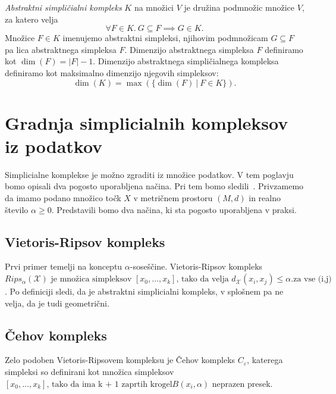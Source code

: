 \begin{definicija}
      \textit{Abstraktni simpli\v{c}ialni kompleks} \(K\) na množici \(V\) je družina podmnožic množice \(V\), za katero velja
  \[
  \forall F \in K. \ G \subseteq F \implies G \in K.
  \]
  Množice \(F \in K\) imenujemo abstraktni simpleksi, njihovim podmnožicam \(G \subseteq F\) pa lica abstraktnega simpleksa \(F\). Dimenzijo abstraktnega simpleksa \(F\) definiramo kot \(\dim(F) = |F| - 1\). Dimenzijo abstraktnega simpli\v{c}ialnega kompleksa definiramo kot maksimalno dimenzijo njegovih simpleksov:
  \[
  \dim(K) = \max(\{\dim(F) \ | \ F \in K\}).
  \]
\end{definicija}


\section{Gradnja simplicialnih kompleksov iz podatkov}
Simplicialne komplekse je možno zgraditi iz množice podatkov. V tem poglavju bomo opisali dva pogosto uporabljena načina. Pri tem bomo sledili~\cite{10.1007/978-3-319-45378-1_1}. Privzamemo da imamo podano množico točk $X$ v metričnem prostoru $(M, d)$ in realno število $\alpha \geq 0$. Predstavili bomo dva načina, ki sta pogosto uporabljena v praksi.~\cite{kun2015cech}

\subsection{Vietoris-Ripsov kompleks}
Prvi primer temelji na konceptu $\alpha$-soseščine. Vietoris-Ripsov kompleks $Rips_{\alpha}(\mathcal{X}) \text{ je množica simpleksov } [x_0, \ldots, x_k] \text{, tako da velja } d_{\mathcal{X}}(x_i, x_j) \leq \alpha. \text{za vse (i,j)}$. Po definiciji sledi, da je abstraktni simplicialni kompleks, v splošnem pa ne velja, da je tudi geometrični.

\subsection{Čehov kompleks}
Zelo podoben Vietoris-Ripsovem kompleksu je Čehov kompleks $C_\varepsilon$, katerega simpleksi so definirani kot množica simpleksov $[x_0, \ldots, x_k] \text{, tako da ima k + 1 zaprtih krogel} B(x_i, \alpha)$ neprazen presek.

